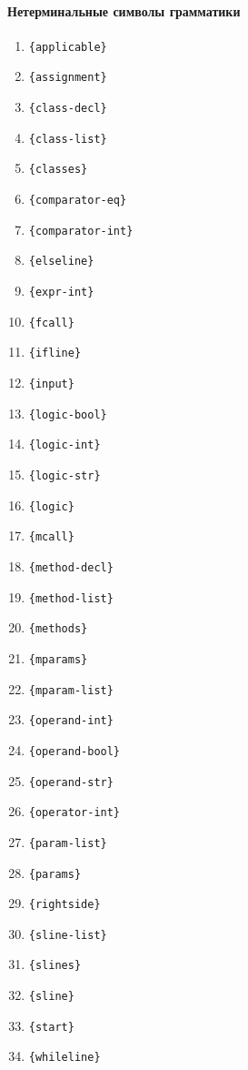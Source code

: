 \documentclass[a4paper,10pt,notitlepage,pdftex]{scrreprt}
\begin{document}
        \paragraph{Нетерминальные символы грамматики}
        \label{para:nonterm}
        \begin{multicols}{3}
            \begin{enumerate}
                \item \verb'{applicable}'
                \item \verb'{assignment}'
                \item \verb'{class-decl}'
                \item \verb'{class-list}'
                \item \verb'{classes}'
                \item \verb'{comparator-eq}'
                \item \verb'{comparator-int}'
                \item \verb'{elseline}'
                \item \verb'{expr-int}'
                \item \verb'{fcall}'
                \item \verb'{ifline}'
                \item \verb'{input}'
                \item \verb'{logic-bool}'
                \item \verb'{logic-int}'
                \item \verb'{logic-str}'
                \item \verb'{logic}'
                \item \verb'{mcall}'
                \item \verb'{method-decl}'
                \item \verb'{method-list}'
                \item \verb'{methods}'
                \item \verb'{mparams}'
                \item \verb'{mparam-list}'
                \item \verb'{operand-int}'
                \item \verb'{operand-bool}'
                \item \verb'{operand-str}'
                \item \verb'{operator-int}'
                \item \verb'{param-list}'
                \item \verb'{params}'
                \item \verb'{rightside}'
                \item \verb'{sline-list}'
                \item \verb'{slines}'
                \item \verb'{sline}'
                \item \verb'{start}'
                \item \verb'{whileline}'
            \end{enumerate}
        \end{multicols}
\end{document}
